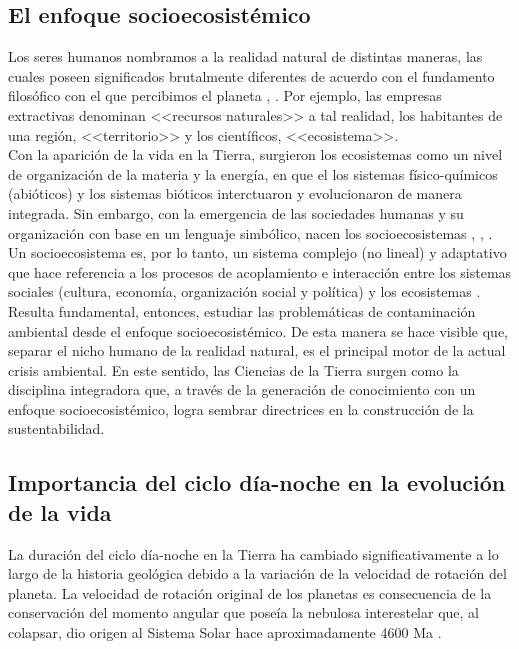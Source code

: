 \subsection{El enfoque socioecosistémico}

Los seres humanos nombramos a la realidad natural de distintas maneras, las cuales poseen significados brutalmente diferentes de acuerdo con el fundamento filosófico con el que percibimos el planeta \citep{Avila2019}, \citep{Uribe2014}. Por ejemplo, las empresas extractivas denominan <<recursos naturales>> a tal realidad, los habitantes de una región, <<territorio>> y los científicos, <<ecosistema>>.\\

Con la aparición de la vida en la Tierra, surgieron los ecosistemas como un nivel de organización de la materia y la energía, en que el los sistemas físico-químicos (abióticos) y los sistemas bióticos interctuaron y evolucionaron de manera integrada. Sin embargo, con la emergencia de las sociedades humanas y su organización con base en un lenguaje simbólico, nacen los socioecosistemas \citep{Avila2019}, \citep{Uribe2014}, \citep{Urquiza2015}.\\

Un socioecosistema es, por lo tanto, un sistema complejo (no lineal) y adaptativo que hace referencia a los procesos de acoplamiento e interacción entre los sistemas sociales (cultura, economía, organización social y política) y los ecosistemas \citep{Urquiza2015}.\\

Resulta fundamental, entonces, estudiar las problemáticas de contaminación ambiental desde el enfoque socioecosistémico. De esta manera se hace visible que, separar el nicho humano de la realidad natural, es el principal motor de la actual crisis ambiental. En este sentido, las Ciencias de la Tierra surgen como la disciplina integradora que, a través de la generación de conocimiento con un enfoque socioecosistémico, logra sembrar directrices en la construcción de la sustentabilidad.\\

\subsection{Importancia del ciclo día-noche en la evolución de la vida}

La duración del ciclo día-noche en la Tierra ha cambiado significativamente a lo largo de la historia geológica debido a la variación de la velocidad de rotación del planeta. La velocidad de rotación original de los planetas  es consecuencia de la conservación del momento angular que poseía la nebulosa interestelar que, al colapsar, dio origen al Sistema Solar hace aproximadamente 4600 Ma \citep{Greaves2005}.\\

